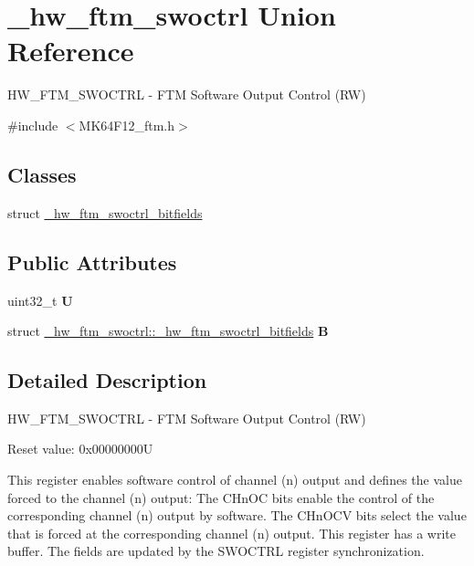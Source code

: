\hypertarget{union__hw__ftm__swoctrl}{}\section{\+\_\+hw\+\_\+ftm\+\_\+swoctrl Union Reference}
\label{union__hw__ftm__swoctrl}


H\+W\+\_\+\+F\+T\+M\+\_\+\+S\+W\+O\+C\+T\+RL -\/ F\+TM Software Output Control (RW)  




{\ttfamily \#include $<$M\+K64\+F12\+\_\+ftm.\+h$>$}

\subsection*{Classes}
\begin{DoxyCompactItemize}
\item 
struct \hyperlink{struct__hw__ftm__swoctrl_1_1__hw__ftm__swoctrl__bitfields}{\+\_\+hw\+\_\+ftm\+\_\+swoctrl\+\_\+bitfields}
\end{DoxyCompactItemize}
\subsection*{Public Attributes}
\begin{DoxyCompactItemize}
\item 
uint32\+\_\+t {\bfseries U}\hypertarget{union__hw__ftm__swoctrl_ae903c9a9de87d52ec50b5d9f62df7b6c}{}\label{union__hw__ftm__swoctrl_ae903c9a9de87d52ec50b5d9f62df7b6c}

\item 
struct \hyperlink{struct__hw__ftm__swoctrl_1_1__hw__ftm__swoctrl__bitfields}{\+\_\+hw\+\_\+ftm\+\_\+swoctrl\+::\+\_\+hw\+\_\+ftm\+\_\+swoctrl\+\_\+bitfields} {\bfseries B}\hypertarget{union__hw__ftm__swoctrl_aa5ebad0ae1319079393fcd7a17d3e155}{}\label{union__hw__ftm__swoctrl_aa5ebad0ae1319079393fcd7a17d3e155}

\end{DoxyCompactItemize}


\subsection{Detailed Description}
H\+W\+\_\+\+F\+T\+M\+\_\+\+S\+W\+O\+C\+T\+RL -\/ F\+TM Software Output Control (RW) 

Reset value\+: 0x00000000U

This register enables software control of channel (n) output and defines the value forced to the channel (n) output\+: The C\+Hn\+OC bits enable the control of the corresponding channel (n) output by software. The C\+Hn\+O\+CV bits select the value that is forced at the corresponding channel (n) output. This register has a write buffer. The fields are updated by the S\+W\+O\+C\+T\+RL register synchronization. 

